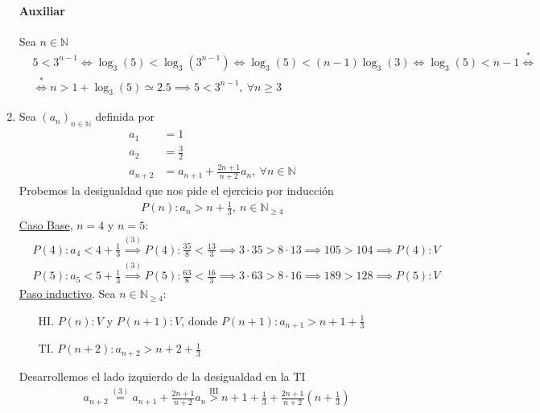 \begin{enumerate}[label=\roman*)]
    \paragraph{Auxiliar}{Sea $n \in \mathbb{N}$
        \begin{align*}
            &5 < 3^{n-1} \iff \log_3(5) < \log_3(3^{n-1}) \iff \log_3(5) < (n-1)\log_3(3) \iff \log_3(5) < n-1 
            \overset{*}{\iff} \\
            &\overset{*}{\iff} n > 1 + \log_3(5) \simeq 2.5 \implies 5 < 3^{n-1},\ \forall n \geq 3
        \end{align*}  
    }

    \item Sea $(a_n)_{n \in \mathbb{N}}$ definida por
    \setcounter{equation}{0}
    \begin{align}
        a_1 &= 1 \\
        a_2 &= \frac{3}{2} \\
        a_{n+2} &= a_{n+1} + \frac{2n+1}{n+2}a_n,\ \forall n \in \mathbb{N}
    \end{align}
    Probemos la desigualdad que nos pide el ejercicio por inducción
    \begin{align*}
        P(n): a_n > n + \frac{1}{3}, \ n \in \mathbb{N}_{\geq 4}   
    \end{align*}
    \underline{Caso Base}, $n = 4$ y $n = 5$:
    \begin{align*}
        &P(4): a_4 < 4 + \frac{1}{3} \overset{(3)}{\implies} P(4): \frac{35}{8} < \frac{13}{3} \implies 
        3 \cdot 35 > 8 \cdot 13 \implies 105 > 104 \implies P(4):V \\
        &P(5): a_5 < 5 + \frac{1}{3} \overset{(3)}{\implies} P(5): \frac{63}{8} < \frac{16}{3} \implies 
        3 \cdot 63 > 8 \cdot 16 \implies 189 > 128 \implies P(5):V
    \end{align*}
    \underline{Paso inductivo}. Sea $n \in \mathbb{N}_{\geq 4}$:
    \begin{enumerate}
        \item[HI.] $P(n):V \text{ y } P(n+1):V$, donde $P(n+1): a_{n+1} > n + 1 + \displaystyle \frac{1}{3}$
        \item[TI.] $P(n+2): a_{n+2} > n + 2 + \displaystyle \frac{1}{3}$
    \end{enumerate}
        Desarrollemos el lado izquierdo de la desigualdad en la TI
    \begin{align*}
        &a_{n+2} \overset{(3)}{=} a_{n+1} + \frac{2n+1}{n+2}a_n \overset{\text{HI}}{>} 
        n + 1 + \frac{1}{3} + \frac{2n+1}{n+2}\left(n + \frac{1}{3}\right)  

\end{align*}
\end{enumerate}

